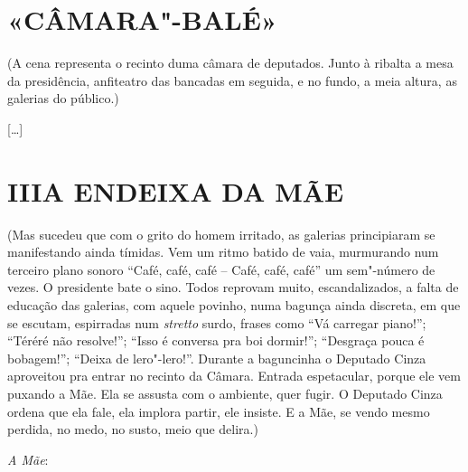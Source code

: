 \section*{«CÂMARA"-BALÉ»}

\hfill\parbox{150pt}{(A cena representa o recinto duma câmara de
deputados. Junto à ribalta a mesa da
presidência, anfiteatro das bancadas em
seguida, e no fundo, a meia altura, as galerias do público.)}

{[}\ldots{}{]}

\section*{III\break A ENDEIXA DA MÃE}

\hfill\parbox{150pt}{
(Mas sucedeu que com o grito do homem irritado, as galerias principiaram
se manifestando ainda tímidas. Vem um ritmo batido de vaia, murmurando
num terceiro plano sonoro ``Café, café, café -- Café, café, café'' um
sem"-número de vezes. O presidente bate o sino. Todos reprovam muito,
escandalizados, a falta de educação das galerias, com aquele povinho,
numa bagunça ainda discreta, em que se escutam, espirradas num
\emph{stretto} surdo, frases como ``Vá carregar piano!''; ``Téréré não
resolve!''; ``Isso é conversa pra boi dormir!''; ``Desgraça pouca é
bobagem!''; ``Deixa de lero"-lero!''. Durante a baguncinha o Deputado
Cinza aproveitou pra entrar no recinto da Câmara. Entrada espetacular,
porque ele vem puxando a Mãe. Ela se assusta com o ambiente, quer fugir.
O Deputado Cinza ordena que ela fale, ela implora partir, ele insiste. E
a Mãe, se vendo mesmo perdida, no medo, no susto, meio que delira.)
}

\emph{A Mãe}:

